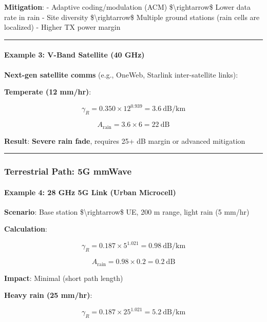 \textbf{Mitigation}: - Adaptive coding/modulation (ACM)
\$\textbackslash rightarrow\$ Lower data rate in rain - Site diversity
\$\textbackslash rightarrow\$ Multiple ground stations (rain cells are
localized) - Higher TX power margin

\begin{center}\rule{0.5\linewidth}{0.5pt}\end{center}

\paragraph{Example 3: V-Band Satellite (40
GHz)}\label{example-3-v-band-satellite-40-ghz}

\textbf{Next-gen satellite comms} (e.g., OneWeb, Starlink
inter-satellite links):

\textbf{Temperate (12 mm/hr)}:

\[
\gamma_R = 0.350 \times 12^{0.939} = 3.6\ \text{dB/km}
\]

\[
A_{\text{rain}} = 3.6 \times 6 = 22\ \text{dB}
\]

\textbf{Result}: \textbf{Severe rain fade}, requires 25+ dB margin or
advanced mitigation

\begin{center}\rule{0.5\linewidth}{0.5pt}\end{center}

\subsubsection{Terrestrial Path: 5G
mmWave}\label{terrestrial-path-5g-mmwave}

\paragraph{Example 4: 28 GHz 5G Link (Urban
Microcell)}\label{example-4-28-ghz-5g-link-urban-microcell}

\textbf{Scenario}: Base station \$\textbackslash rightarrow\$ UE, 200 m
range, light rain (5 mm/hr)

\textbf{Calculation}:

\[
\gamma_R = 0.187 \times 5^{1.021} = 0.98\ \text{dB/km}
\]

\[
A_{\text{rain}} = 0.98 \times 0.2 = 0.2\ \text{dB}
\]

\textbf{Impact}: Minimal (short path length)

\textbf{Heavy rain (25 mm/hr)}:

\[
\gamma_R = 0.187 \times 25^{1.021} = 5.2\ \text{dB/km}
\]

